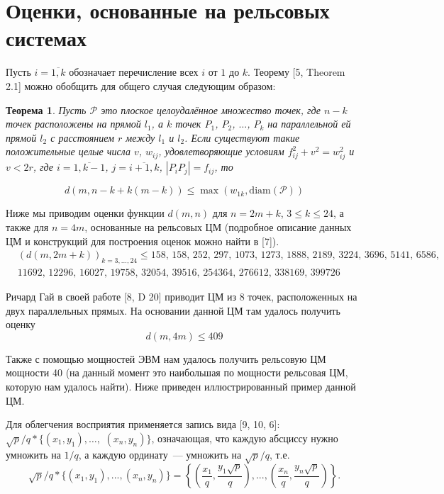 \documentclass[12pt]{article}
\theoremstyle{theorem}
\newtheorem{theorem}{Теорема}
\theoremstyle{dfn}
\theoremstyle{remark}
\begin{document}
\section{Оценки, основанные на рельсовых системах}

Пусть $i = \overline{1, k}$ обозначает перечисление всех $i$
от $1$ до $k$.
Теорему [5, Theorem 2.1] можно обобщить для общего случая
следующим образом:

\begin{theorem}
	Пусть $\mathcal{P}$ это плоское целоудалённое множество точек, где 
	$n - k$ точек расположены на прямой $l_1$, а $k$ точек $P_1$, $P_2$, $\ldots$,
	$P_k$ на параллельной ей прямой $l_2$ с расстоянием $r$ между $l_1$ и $l_2$. 
	Если существуют такие положительные целые числа $v$, $w_{ij}$, удовлетворяющие
	условиям $f_{ij}^{2} + v^{2} = w_{ij}^{2}$ и $v < 2r$, где 
	$i = \overline{1, k - 1}$, $j = \overline{i + 1, k}$, $|P_{i}P_{j}| = f_{ij}$,
	то

	\begin{equation}
		d(m, n - k + k(m - k)) \leq \max(w_{1k}, \operatorname{diam(\mathcal{P})})
	\end{equation}
	
\end{theorem}

Ниже мы приводим оценки функции $d(m, n)$ для $n = 2m + k$, $3 \leq k \leq 24$, а также для $n = 4m$, основанные на рельсовых ЦМ (подробное описание данных ЦМ и конструкций для построения оценок можно найти в [7]).
\begin{align*}
&(d(m, 2m + k))_{k = 3, \ldots, 24} \leq 158,\, 158,\, 252,\, 297,\, 1073,\, 1273,\, 1888,\, 2189,\, 3224,\, 3696,\, 5141,\, 6586,\, \\
&11692,\, 12296,\, 16027,\, 19758,\, 32054,\, 39516,\, 254364,\, 276612,\, 338169,\, 399726
\end{align*}

Ричард Гай в своей работе [8, D 20] приводит ЦМ из $8$ точек, расположенных на двух параллельных прямых. На основании данной ЦМ там удалось получить оценку
\begin{equation}\label{result1}
d(m, 4m) \leq 409
\end{equation}

Также с помощью мощностей ЭВМ нам удалось получить рельсовую ЦМ мощности 40 (на данный момент это наибольшая по мощности рельсовая ЦМ, которую нам удалось найти).
Ниже приведен иллюстрированный пример данной ЦМ.

Для облегчения восприятия применяется запись вида 
[9, 10, 6]:
$\sqrt{p}/q * \{ (x_1,y_1), \ldots,$ $ (x_n, y_n)  \}$,
означающая, что каждую абсциссу нужно умножить на $1/q$,
а каждую ординату~--- умножить на $\sqrt{p}/q$, т.е.
$$
	\sqrt{p}/q * \{ (x_1,y_1), ..., (x_n, y_n)  \}
	=
	\left\{ \left(\frac{x_1}{q},\frac{y_1\sqrt{p}}{q}\right), ..., \left(\frac{x_n}{q},   \frac{y_n\sqrt{p}}{q}\right)  \right\}.
$$
\end{document}
